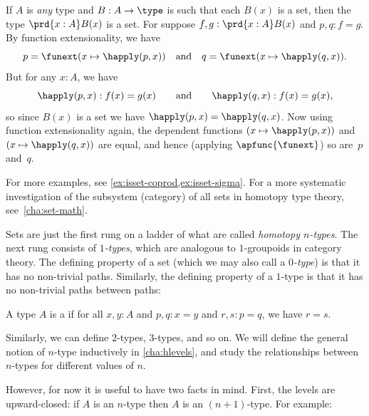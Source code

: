 \begin{eg}\label{thm:isset-forall}
  If $A$ is \emph{any} type and $B:A\to \type$ is such that each $B(x)$ is a set, then the type $\prd{x:A} B(x)$ is a set.
  For suppose $f,g:\prd{x:A} B(x)$ and $p,q:f=g$.
  By function extensionality, we have
  \begin{equation*}
    p = {\funext (x \mapsto \happly(p,x))}
    \quad\text{and}\quad
    q = {\funext (x \mapsto \happly(q,x))}.
  \end{equation*}
  But for any $x:A$, we have
  \begin{equation*}
   \happly(p,x):f(x)=g(x)
   \qquad\text{and}\qquad
   \happly(q,x):f(x)=g(x),
  \end{equation*}
  so since $B(x)$ is a set we have $\happly(p,x) = \happly(q,x)$.
  Now using function extensionality again, the dependent functions $(x \mapsto \happly(p,x))$ and $(x \mapsto \happly(q,x))$ are equal, and hence (applying $\apfunc{\funext}$) so are~$p$ and~$q$.
\end{eg}

For more examples, see \cref{ex:isset-coprod,ex:isset-sigma}.  For a more systematic investigation of the subsystem (category) of all sets in homotopy type theory, see~\cref{cha:set-math}.

%

Sets are just the first rung on a ladder of what are called \emph{homotopy $n$-types}.
The next rung consists of \emph{$1$-types}, which are analogous to $1$-groupoids in category theory.
The defining property of a set (which we may also call a \emph{$0$-type}) is that it has no non-trivial paths.
Similarly, the defining property of a $1$-type is that it has no non-trivial paths between paths:

\begin{defn}\label{defn:1type}
  A type $A$ is a 
  if for all $x,y:A$ and $p,q:x=y$ and $r,s:p=q$, we have $r=s$.
\end{defn}

Similarly, we can define $2$-types, $3$-types, and so on.
We will define the general notion of $n$-type inductively in \cref{cha:hlevels}, and study the relationships between $n$-types for different values of $n$.

However, for now it is useful to have two facts in mind.
First, the levels are upward-closed: if $A$ is an $n$-type then $A$ is an $(n+1)$-type.
For example:

